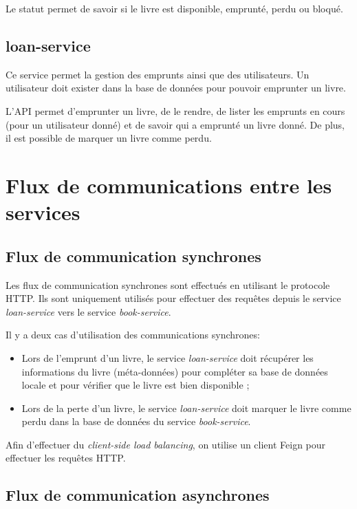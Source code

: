 \documentclass[
  french,
  a4paper,
]{scrartcl}
\begin{document}
Le statut permet de savoir si le livre est disponible, emprunté, perdu ou bloqué. 


\subsection{loan-service}

Ce service permet la gestion des emprunts ainsi que des utilisateurs. 
Un utilisateur doit exister dans la base de données pour pouvoir emprunter un livre. 

L'API permet d'emprunter un livre, de le rendre, de lister les emprunts en cours (pour un utilisateur donné)
et de savoir qui a emprunté un livre donné. De plus, il est possible de marquer un livre comme perdu. 


\section{Flux de communications entre les services}

\subsection{Flux de communication synchrones}

Les flux de communication synchrones sont effectués en utilisant le protocole HTTP. Ils sont 
uniquement utilisés pour effectuer des requêtes depuis le service \textit{loan-service} vers le service
\textit{book-service}. 

Il y a deux cas d'utilisation des communications synchrones:

\begin{itemize}
  \item Lors de l'emprunt d'un livre, le service \textit{loan-service} doit récupérer 
    les informations du livre (méta-données) pour compléter sa base de données locale et pour 
    vérifier que le livre est bien disponible ; 

  \item Lors de la perte d'un livre, le service \textit{loan-service} doit marquer le livre
    comme perdu dans la base de données du service \textit{book-service}.
\end{itemize}

Afin d'effectuer du \textit{client-side load balancing}, on utilise un client Feign pour effectuer
les requêtes HTTP.

\subsection{Flux de communication asynchrones}
\end{document}
